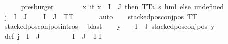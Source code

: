 \begin{isabellebody}
\ \ \ \ \isamarkupfalse%
\ presburger\isanewline
\ \ \isamarkupfalse%
\ {\isasymPsi}\ \ {\isachardoublequoteopen}{\isasymPsi}\ {\isacharequal}{\kern0pt}\ {\isacharparenleft}{\kern0pt}{\isasymlambda}x{\isachardot}{\kern0pt}\ if\ x\ {\isasymin}\ {\isacharparenleft}{\kern0pt}I\ {\isasyminter}\ J{\isacharparenright}{\kern0pt}\ then\ TT{\isacharcolon}{\kern0pt}{\isacharcolon}{\kern0pt}{\isacharparenleft}{\kern0pt}{\isacharprime}{\kern0pt}a{\isacharcomma}{\kern0pt}\ {\isacharprime}{\kern0pt}s{\isacharparenright}{\kern0pt}\ hml\ else\ undefined{\isacharparenright}{\kern0pt}{\isachardoublequoteclose}\isanewline
\ \ \isamarkupfalse%
\ {\isacartoucheopen}j\ {\isasymin}\ I\ {\isasyminter}\ J{\isacartoucheclose}\ \isamarkupfalse%
\ {\isachardoublequoteopen}{\isasymPsi}\ {\isacharbackquote}{\kern0pt}\ {\isacharparenleft}{\kern0pt}I\ {\isasyminter}\ J{\isacharparenright}{\kern0pt}\ {\isacharequal}{\kern0pt}\ {\isacharbraceleft}{\kern0pt}TT{\isacharbraceright}{\kern0pt}{\isachardoublequoteclose}\ \isanewline
\ \ \ \ \isamarkupfalse%
\ auto\isanewline
\ \ \isamarkupfalse%
\ {\isachardoublequoteopen}stacked{\isacharunderscore}{\kern0pt}pos{\isacharunderscore}{\kern0pt}conj{\isacharunderscore}{\kern0pt}pos\ TT{\isachardoublequoteclose}\ \isanewline
\ \ \ \ \isamarkupfalse%
\ stacked{\isacharunderscore}{\kern0pt}pos{\isacharunderscore}{\kern0pt}conj{\isacharunderscore}{\kern0pt}pos{\isachardot}{\kern0pt}intros{\isacharparenleft}{\kern0pt}{}{\isacharparenright}{\kern0pt}\ \isamarkupfalse%
\ blast\isanewline
\ \ \isamarkupfalse%
\ {\isachardoublequoteopen}{\isacharparenleft}{\kern0pt}{\isasymforall}y\ {\isasymin}\ {\isacharparenleft}{\kern0pt}{\isasymPsi}\ {\isacharbackquote}{\kern0pt}\ {\isacharparenleft}{\kern0pt}I\ {\isasyminter}\ J{\isacharparenright}{\kern0pt}{\isacharparenright}{\kern0pt}{\isachardot}{\kern0pt}\ stacked{\isacharunderscore}{\kern0pt}pos{\isacharunderscore}{\kern0pt}conj{\isacharunderscore}{\kern0pt}pos\ y{\isacharparenright}{\kern0pt}{\isachardoublequoteclose}\ \isamarkupfalse%
\ {\isasymPsi}{\isacharunderscore}{\kern0pt}def\ {\isacartoucheopen}j\ {\isasymin}\ I\ {\isasyminter}\ J{\isacartoucheclose}\ \isanewline
\ \ \ \ \isamarkupfalse%
\ {\isacartoucheopen}{\isasymPsi}\ {\isacharbackquote}{\kern0pt}\ {\isacharparenleft}{\kern0pt}I\ {\isasyminter}\ J{\isacharparenright}{\kern0pt}\ {\isacharequal}{\kern0pt}\ {\isacharbraceleft}{\kern0pt}TT{\isacharbraceright}{\kern0pt}{\isacartoucheclose}\ \isamarkupfalse%

\end{isabellebody}
